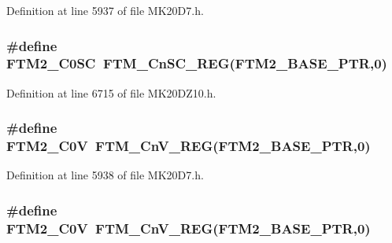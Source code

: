 Definition at line 5937 of file M\+K20\+D7.\+h.

\subsubsection[{\texorpdfstring{F\+T\+M2\+\_\+\+C0\+SC}{FTM2_C0SC}}]{\setlength{\rightskip}{0pt plus 5cm}\#define F\+T\+M2\+\_\+\+C0\+SC~{\bf F\+T\+M\+\_\+\+Cn\+S\+C\+\_\+\+R\+EG}({\bf F\+T\+M2\+\_\+\+B\+A\+S\+E\+\_\+\+P\+TR},0)}\hypertarget{group___f_t_m___register___accessor___macros_ga23ef9825e51056c36a6a5a19e784eded}{}\label{group___f_t_m___register___accessor___macros_ga23ef9825e51056c36a6a5a19e784eded}


Definition at line 6715 of file M\+K20\+D\+Z10.\+h.

\subsubsection[{\texorpdfstring{F\+T\+M2\+\_\+\+C0V}{FTM2_C0V}}]{\setlength{\rightskip}{0pt plus 5cm}\#define F\+T\+M2\+\_\+\+C0V~{\bf F\+T\+M\+\_\+\+Cn\+V\+\_\+\+R\+EG}({\bf F\+T\+M2\+\_\+\+B\+A\+S\+E\+\_\+\+P\+TR},0)}\hypertarget{group___f_t_m___register___accessor___macros_ga92b3a29332163807bb6ae240cfa2e4aa}{}\label{group___f_t_m___register___accessor___macros_ga92b3a29332163807bb6ae240cfa2e4aa}


Definition at line 5938 of file M\+K20\+D7.\+h.

\subsubsection[{\texorpdfstring{F\+T\+M2\+\_\+\+C0V}{FTM2_C0V}}]{\setlength{\rightskip}{0pt plus 5cm}\#define F\+T\+M2\+\_\+\+C0V~{\bf F\+T\+M\+\_\+\+Cn\+V\+\_\+\+R\+EG}({\bf F\+T\+M2\+\_\+\+B\+A\+S\+E\+\_\+\+P\+TR},0)}\hypertarget{group___f_t_m___register___accessor___macros_ga92b3a29332163807bb6ae240cfa2e4aa}{}\label{group___f_t_m___register___accessor___macros_ga92b3a29332163807bb6ae240cfa2e4aa}



